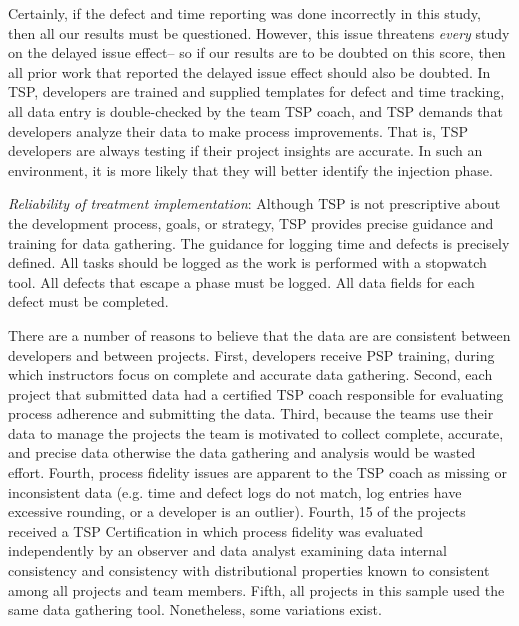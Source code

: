 \documentclass[smallcondensed]{svjour3}
\begin{document}
Certainly, if the defect and time reporting was done
incorrectly in this study, then all our results must be questioned.
However,  this issue threatens {\em every} study on the delayed
issue effect-- so if our results are to be doubted on this score,
then all prior work that reported the delayed issue effect should
also be doubted.  In TSP, developers are trained and supplied templates for defect and time tracking, all data entry is double-checked by the team TSP coach, and TSP demands that developers analyze their data to make process improvements. That is, TSP developers are always testing
if their project insights are accurate. In such an environment,
it is more likely that they will better identify the injection phase.

\textit{Reliability of treatment implementation}: 
Although TSP is not prescriptive about the development process, goals, or strategy, TSP provides precise guidance and training for data gathering. The guidance for logging time and defects is precisely defined. All tasks should be logged as the work is performed with a stopwatch tool. All defects that escape a phase must be logged. All data fields for each defect must be completed.

There are a number of reasons to believe that the data are are consistent between developers and between projects. First, developers receive PSP training, during which instructors focus on complete and accurate data gathering. Second, each project that submitted data had a certified TSP coach responsible for evaluating  process adherence and submitting the data. Third, because the teams use their data to manage the projects the team is motivated to collect complete, accurate, and precise data otherwise the data gathering and analysis would be wasted effort. Fourth, process fidelity issues are apparent to the TSP coach as missing or inconsistent data (e.g. time and defect logs do not match, log entries have excessive rounding, or a developer is an outlier). Fourth, 15 of the projects received a TSP Certification in which process fidelity was evaluated independently by an observer and data analyst examining data internal consistency and consistency with  distributional properties known to consistent among all projects and team members. Fifth, all projects in this sample used the same data gathering tool. Nonetheless, some variations exist. 
\end{document}
